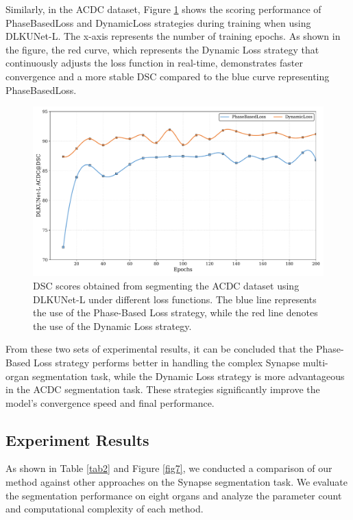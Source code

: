 \documentclass[sn-mathphys-num]{sn-jnl}
\theoremstyle{thmstyleone}%
\theoremstyle{thmstyletwo}%
\theoremstyle{thmstylethree}%
\begin{document}
Similarly, in the ACDC dataset, Figure \ref{fig6} shows the scoring performance of PhaseBasedLoss and DynamicLoss strategies during training when using DLKUNet-L.
The x-axis represents the number of training epochs.
As shown in the figure, the red curve, which represents the Dynamic Loss strategy that continuously adjusts the loss function in real-time, demonstrates faster convergence and a more stable DSC compared to the blue curve representing PhaseBasedLoss.
\begin{figure}[ht]
    \centering
    \includegraphics[width=\textwidth]{figure6.pdf}
    \caption{DSC scores obtained from segmenting the ACDC dataset using DLKUNet-L under different loss functions.
    The blue line represents the use of the Phase-Based Loss strategy, while the red line denotes the use of the Dynamic Loss strategy.}\label{fig6}
\end{figure}

From these two sets of experimental results, it can be concluded that the Phase-Based Loss strategy performs better in handling the complex Synapse multi-organ segmentation task,
while the Dynamic Loss strategy is more advantageous in the ACDC segmentation task.
These strategies significantly improve the model's convergence speed and final performance.

\subsection{Experiment Results}\label{subsec7}

As shown in Table \ref{tab2} and Figure \ref{fig7}, we conducted a comparison of our method against other approaches on the Synapse segmentation task.
We evaluate the segmentation performance on eight organs and analyze the parameter count and computational complexity of each method.
\end{document}
